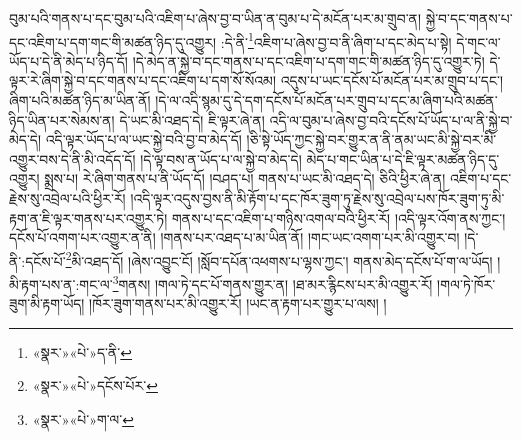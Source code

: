 བུམ་པའི་གནས་པ་དང་བུམ་པའི་འཇིག་པ་ཞེས་བྱ་བ་ཡིན་ན་བུམ་པ་དེ་མངོན་པར་མ་གྲུབ་ན། སྐྱེ་བ་དང་གནས་པ་དང་འཇིག་པ་དག་གང་གི་མཚན་ཉིད་དུ་འགྱུར། :དེ་ནི་\footnote{«སྣར་»«པེ་»ད་ནི་}འཇིག་པ་ཞེས་བྱ་བ་ནི་ཞིག་པ་དང་མེད་པ་སྟེ། དེ་གང་ལ་ཡོད་པ་དེ་ནི་མེད་པ་ཉིད་དོ། །དེ་མེད་ན་སྐྱེ་བ་དང་གནས་པ་དང་འཇིག་པ་དག་གང་གི་མཚན་ཉིད་དུ་འགྱུར་ཏེ། དེ་ལྟར་རེ་ཞིག་སྐྱེ་བ་དང་གནས་པ་དང་འཇིག་པ་དག་སོ་སོའམ། འདུས་པ་ཡང་དངོས་པོ་མངོན་པར་མ་གྲུབ་པ་དང་། ཞིག་པའི་མཚན་ཉིད་མ་ཡིན་ནོ། །དེ་ལ་འདི་སྙམ་དུ་དེ་དག་དངོས་པོ་མངོན་པར་གྲུབ་པ་དང་མ་ཞིག་པའི་མཚན་ཉིད་ཡིན་པར་སེམས་ན། དེ་ཡང་མི་འཐད་དེ། ཇི་ལྟར་ཞེ་ན། འདི་ལ་བུམ་པ་ཞེས་བྱ་བའི་དངོས་པོ་ཡོད་པ་ལ་ནི་སྐྱེ་བ་མེད་དེ། འདི་ལྟར་ཡོད་པ་ལ་ཡང་སྐྱེ་བའི་བྱ་བ་མེད་དོ། །ཅི་སྟེ་ཡོད་ཀྱང་སྐྱེ་བར་གྱུར་ན་ནི་ནམ་ཡང་མི་སྐྱེ་བར་མི་འགྱུར་བས་དེ་ནི་མི་འདོད་དོ། །དེ་ལྟ་བས་ན་ཡོད་པ་ལ་སྐྱེ་བ་མེད་དེ། མེད་པ་གང་ཡིན་པ་དེ་ཇི་ལྟར་མཚན་ཉིད་དུ་འགྱུར། སྨྲས་པ། རེ་ཞིག་གནས་པ་ནི་ཡོད་དོ། །བཤད་པ། གནས་པ་ཡང་མི་འཐད་དེ། ཅིའི་ཕྱིར་ཞེ་ན། འཇིག་པ་དང་རྗེས་སུ་འབྲེལ་པའི་ཕྱིར་རོ། །འདི་ལྟར་འདུས་བྱས་ནི་མི་རྟོག་པ་དང་ཁོར་ཟུག་ཏུ་རྗེས་སུ་འབྲེལ་པས་ཁོར་ཟུག་ཏུ་མི་རྟག་ན་ཇི་ལྟར་གནས་པར་འགྱུར་ཏེ། གནས་པ་དང་འཇིག་པ་གཉིས་འགལ་བའི་ཕྱིར་རོ། །འདི་ལྟར་འོག་ནས་ཀྱང་། དངོས་པོ་འགག་པར་འགྱུར་ན་ནི། །གནས་པར་འཐད་པ་མ་ཡིན་ནོ། །གང་ཡང་འགག་པར་མི་འགྱུར་བ། །དེ་ནི་:དངོས་པོ་\footnote{«སྣར་»«པེ་»དངོས་པོར་}མི་འཐད་དོ། །ཞེས་འབྱུང་ངོ། །སློབ་དཔོན་འཕགས་པ་ལྷས་ཀྱང་། གནས་མེད་དངོས་པོ་ག་ལ་ཡོད། །མི་རྟག་པས་ན་:གང་ལ་\footnote{«སྣར་»«པེ་»ག་ལ་}གནས། །གལ་ཏེ་དང་པོ་གནས་གྱུར་ན། །ཐ་མར་རྙིངས་པར་མི་འགྱུར་རོ། །གལ་ཏེ་ཁོར་ཟུག་མི་རྟག་ཡོད། །ཁོར་ཟུག་གནས་པར་མི་འགྱུར་རོ། །ཡང་ན་རྟག་པར་གྱུར་པ་ལས། །
